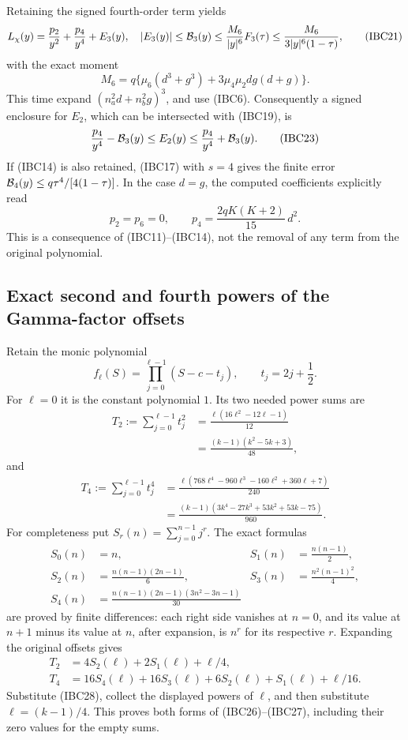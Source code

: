 Retaining the signed fourth-order term yields
\[
 L_\chi(y)=\frac{p_2}{y^2}+\frac{p_4}{y^4}+E_3(y),
 \quad
 |E_3(y)|\leq{\cal B}_3(y)
 \leq\frac{M_6}{|y|^6}F_3(\tau)
 \leq\frac{M_6}{3|y|^6(1-\tau)},
 \tag{IBC21}
\]
with the exact moment
\[
 M_6=q\{\mu_6(d^3+g^3)+3\mu_4\mu_2dg(d+g)\}.
 \tag{IBC22}
\]
This time expand \((n_a^2d+n_b^2g)^3\), and use (IBC6).
Consequently a signed enclosure for \(E_2\), which can be intersected
with (IBC19), is
\[
 \frac{p_4}{y^4}-{\cal B}_3(y)
 \leq E_2(y)\leq
 \frac{p_4}{y^4}+{\cal B}_3(y).
 \tag{IBC23}
\]
If (IBC14) is also retained, (IBC17) with \(s=4\) gives the finite
error \({\cal B}_4(y)\leq q\tau^4/[4(1-\tau)]\).
In the case \(d=g\), the computed coefficients explicitly read
\[
 p_2=p_6=0,\qquad
 p_4=\frac{2qK(K+2)}{15}\,d^2.
 \tag{IBC24}
\]
This is a consequence of (IBC11)--(IBC14), not the removal of any term
from the original polynomial.

\subsection{Exact second and fourth powers of the Gamma-factor offsets}

Retain the monic polynomial
\[
 f_\ell(S)=\prod_{j=0}^{\ell-1}(S-c-t_j),
 \qquad t_j=2j+\frac12.
 \tag{IBC25}
\]
For \(\ell=0\) it is the constant polynomial \(1\).
Its two needed power sums are
\[
 \begin{split}
 T_2:=\sum_{j=0}^{\ell-1}t_j^2
   &=\frac{\ell(16\ell^2-12\ell-1)}{12}\\
   &=\frac{(k-1)(k^2-5k+3)}{48},
 \end{split}
 \tag{IBC26}
\]
and
\[
 \begin{split}
 T_4:=\sum_{j=0}^{\ell-1}t_j^4
   &=\frac{\ell(768\ell^4-960\ell^3-160\ell^2+360\ell+7)}{240}\\
   &=\frac{(k-1)(3k^4-27k^3+53k^2+53k-75)}{960}.
 \end{split}
 \tag{IBC27}
\]
For completeness put \(S_r(n)=\sum_{j=0}^{n-1}j^r\).  The exact formulas
\[
 \begin{aligned}
 S_0(n)&=n,& S_1(n)&=\frac{n(n-1)}2,\\
 S_2(n)&=\frac{n(n-1)(2n-1)}6,&
 S_3(n)&=\frac{n^2(n-1)^2}{4},\\
 S_4(n)&=\frac{n(n-1)(2n-1)(3n^2-3n-1)}{30}
 \end{aligned}
 \tag{IBC28}
\]
are proved by finite differences: each right side vanishes at \(n=0\),
and its value at \(n+1\) minus its value at \(n\), after expansion, is
\(n^r\) for its respective \(r\).  Expanding the original offsets gives
\[
 \begin{split}
 T_2&=4S_2(\ell)+2S_1(\ell)+\ell/4,\\
 T_4&=16S_4(\ell)+16S_3(\ell)+6S_2(\ell)+S_1(\ell)+\ell/16.
 \end{split}
 \tag{IBC29}
\]
Substitute (IBC28), collect the displayed powers of \(\ell\), and then
substitute \(\ell=(k-1)/4\).  This proves both forms of
(IBC26)--(IBC27), including their zero values for the empty sums.

